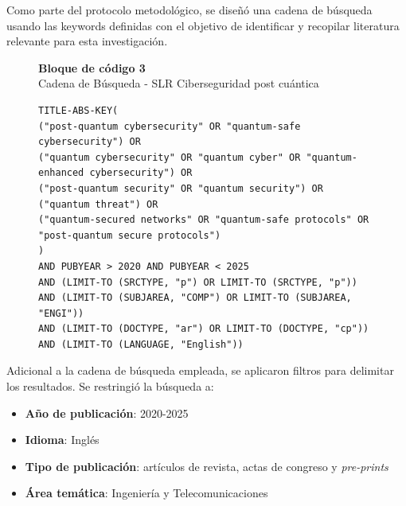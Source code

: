 Como parte del protocolo metodológico, se diseñó una cadena de búsqueda usando las keywords definidas con el objetivo de identificar y recopilar literatura relevante para esta investigación.

\begin{figure}[H]
\label{searchString}
\centering
\begin{minipage}{0.8\textwidth} %
    \centering
    {\fontsize{12}{11}\selectfont %
     \textbf{Bloque de código 3} \\
     Cadena de Búsqueda - SLR Ciberseguridad post cuántica \\
    }
    \begin{verbatim}
TITLE-ABS-KEY(
("post-quantum cybersecurity" OR "quantum-safe
cybersecurity") OR
("quantum cybersecurity" OR "quantum cyber" OR "quantum-
enhanced cybersecurity") OR
("post-quantum security" OR "quantum security") OR
("quantum threat") OR
("quantum-secured networks" OR "quantum-safe protocols" OR
"post-quantum secure protocols")
)
AND PUBYEAR > 2020 AND PUBYEAR < 2025
AND (LIMIT-TO (SRCTYPE, "p") OR LIMIT-TO (SRCTYPE, "p"))
AND (LIMIT-TO (SUBJAREA, "COMP") OR LIMIT-TO (SUBJAREA, "ENGI"))
AND (LIMIT-TO (DOCTYPE, "ar") OR LIMIT-TO (DOCTYPE, "cp"))
AND (LIMIT-TO (LANGUAGE, "English"))
    \end{verbatim}
\end{minipage}
\end{figure}

Adicional a la cadena de búsqueda empleada, se aplicaron filtros para
delimitar los resultados. Se restringió la búsqueda a: 
\begin{itemize}
    \item \textbf{Año de publicación}: 2020-2025
    \item \textbf{Idioma}: Inglés
    \item \textbf{Tipo de publicación}: artículos de revista, actas de congreso y \emph{pre-prints}
    \item \textbf{Área temática}: Ingeniería y Telecomunicaciones
\end{itemize}

